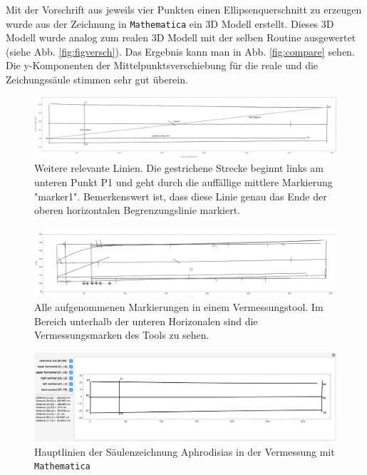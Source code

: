 \documentclass[twocolumn]{bmcart}
\begin{document}
Mit der Vorschrift aus jeweils vier Punkten einen Ellipsenquerschnitt zu erzeugen wurde aus der Zeichnung in  \texttt{Mathematica} ein 3D Modell erstellt.
Dieses 3D Modell wurde analog zum realen 3D Modell mit der selben Routine ausgewertet (siehe Abb. \ref{fig:figversch}). Das Ergebnis kann man in Abb. \ref{fig:compare} sehen. Die y-Komponenten der Mittelpunktsverschiebung für die reale und die Zeichungssäule stimmen sehr gut überein. 

\begin{figure}
	\centering
	\includegraphics[width=1.6\linewidth]{figures/WandWeitereRelevanteLinien.pdf}
	\caption{Weitere relevante Linien. Die gestrichene Strecke beginnt links am unteren Punkt P1 und
		geht durch die auffällige mittlere Markierung "marker1". Bemerkenswert ist, dass diese Linie genau das Ende der oberen horizontalen Begrenzungslinie markiert.}
	\label{weitere}
\end{figure}

\begin{figure}[h]
\centering
\includegraphics[width=1.6\linewidth]{figures/screenshot010}
\caption{Alle aufgenommenen Markierungen in einem Vermessungstool. Im Bereich unterhalb der unteren Horizonalen sind die Vermessungsmarken des Tools zu sehen.}
\label{fig:screenshot010}
\end{figure}

\begin{figure}[h]
\centering
\includegraphics[width=1\linewidth]{figures/screenshot006}
\caption{Hauptlinien der Säulenzeichnung Aphrodisias in der Vermessung mit  \texttt{Mathematica}}
\label{fig:screenshot006}
\end{figure}
\end{document}
